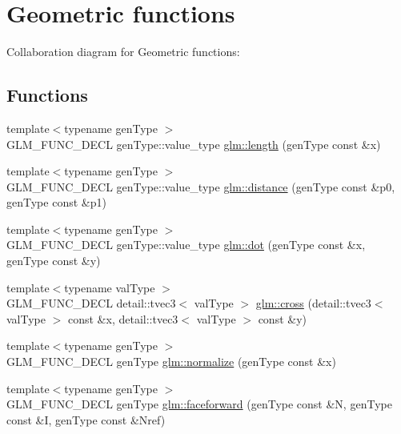 \hypertarget{group__core__func__geometric}{}\section{Geometric functions}
\label{group__core__func__geometric}
Collaboration diagram for Geometric functions\+:
\subsection*{Functions}
\begin{DoxyCompactItemize}
\item 
{\footnotesize template$<$typename gen\+Type $>$ }\\G\+L\+M\+\_\+\+F\+U\+N\+C\+\_\+\+D\+E\+C\+L gen\+Type\+::value\+\_\+type \hyperlink{group__core__func__geometric_ga03b2831439defb8922832b540b91b8a7}{glm\+::length} (gen\+Type const \&x)
\item 
{\footnotesize template$<$typename gen\+Type $>$ }\\G\+L\+M\+\_\+\+F\+U\+N\+C\+\_\+\+D\+E\+C\+L gen\+Type\+::value\+\_\+type \hyperlink{group__core__func__geometric_ga00716eae37e8ae2a76ca7799f9c75682}{glm\+::distance} (gen\+Type const \&p0, gen\+Type const \&p1)
\item 
{\footnotesize template$<$typename gen\+Type $>$ }\\G\+L\+M\+\_\+\+F\+U\+N\+C\+\_\+\+D\+E\+C\+L gen\+Type\+::value\+\_\+type \hyperlink{group__core__func__geometric_ga05244a4e222740e5e38abe91fc51df79}{glm\+::dot} (gen\+Type const \&x, gen\+Type const \&y)
\item 
{\footnotesize template$<$typename val\+Type $>$ }\\G\+L\+M\+\_\+\+F\+U\+N\+C\+\_\+\+D\+E\+C\+L detail\+::tvec3$<$ val\+Type $>$ \hyperlink{group__core__func__geometric_ga15a920c14f06882921757e453426efbe}{glm\+::cross} (detail\+::tvec3$<$ val\+Type $>$ const \&x, detail\+::tvec3$<$ val\+Type $>$ const \&y)
\item 
{\footnotesize template$<$typename gen\+Type $>$ }\\G\+L\+M\+\_\+\+F\+U\+N\+C\+\_\+\+D\+E\+C\+L gen\+Type \hyperlink{group__core__func__geometric_ga15aa87101457e41663b08a8dcc3357f8}{glm\+::normalize} (gen\+Type const \&x)
\item 
{\footnotesize template$<$typename gen\+Type $>$ }\\G\+L\+M\+\_\+\+F\+U\+N\+C\+\_\+\+D\+E\+C\+L gen\+Type \hyperlink{group__core__func__geometric_ga4bbb036ef9527ee9f67384233029ed9b}{glm\+::faceforward} (gen\+Type const \&N, gen\+Type const \&I, gen\+Type const \&Nref)

\end{DoxyCompactItemize}

